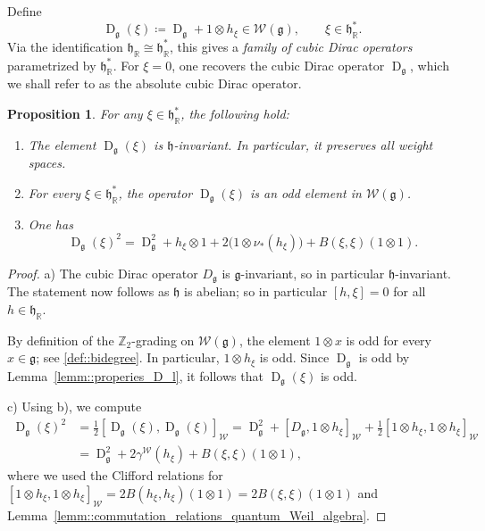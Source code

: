 \documentclass[11pt]{amsart}
\newcommand{\Dirac}{\operatorname{D}}
\def\WW{{\mathcal{W}}}
\def\Weil{{\mathcal{W}(\gg)}}
\def\RR{{\mathbb R}}
\def\hh{{\mathfrak h}}
\def\gg{{\mathfrak{g}}}
\def\ZZ{{\mathbb Z}}
\theoremstyle{plain}
\newtheorem{proposition}[theorem]{Proposition}
\theoremstyle{remark}
\theoremstyle{definition}
\numberwithin{equation}{section}
\theoremstyle{remark}
\begin{document}
Define
\begin{equation}
\Dirac_{\gg}(\xi)\coloneqq \Dirac_{\gg}+1\otimes h_{\xi}\in\mathcal{W}(\gg),
\qquad \xi\in\hh_{\RR}^{\ast}.
\end{equation}
Via the identification $\hh_{\RR}\cong\hh_{\RR}^{\ast}$, this gives a \emph{family of cubic Dirac operators} parametrized by $\hh_{\RR}^{\ast}$. For $\xi=0$, one recovers the cubic Dirac operator $\Dirac_{\gg}$, which we shall refer to as the absolute cubic Dirac operator.

\begin{proposition}\label{prop::square_family_even}
For any $\xi\in\hh_{\RR}^{\ast}$, the following hold:
\begin{enumerate}
\item[a)] The element $\Dirac_{\gg}(\xi)$ is $\hh$-invariant. In particular, it preserves all weight spaces.
\item[b)] For every $\xi\in\hh_{\RR}^{\ast}$, the operator $\Dirac_{\gg}(\xi)$ is an odd element in $\Weil$.
\item[c)] One has
\[
\Dirac_{\gg}(\xi)^{2}
=\Dirac_{\gg}^{2}+h_{\xi}\otimes1+2\bigl(1\otimes\nu_{\ast}(h_{\xi})\bigr)
+B(\xi,\xi)(1\otimes1).
\]
\end{enumerate}
\end{proposition}

\begin{proof}
 a) The cubic Dirac operator $D_{\gg}$ is $\gg$-invariant, so in particular $\hh$-invariant. The statement now follows as $\hh$ is abelian; so in particular $[h,\xi]=0$ for all $h \in \hh_{\RR}$. 

\item[b)] By definition of the $\ZZ_{2}$-grading on $\Weil$, the element $1\otimes x$ is odd for every $x\in\gg$; see \eqref{def::bidegree}. In particular, $1\otimes h_{\xi}$ is odd. Since $\Dirac_{\gg}$ is odd by Lemma~\ref{lemm::properies_D_l}, it follows that $\Dirac_{\gg}(\xi)$ is odd.
 
 c) Using b), we compute
 \[
 \begin{aligned}
 \Dirac_{\gg}(\xi)^{2} &=\tfrac{1}{2}[\Dirac_{\gg}(\xi), \Dirac_{\gg}(\xi)]_{\WW}=\Dirac_{\gg}^{2} + [D_{\gg},1\otimes h_\xi]_{\WW} + \tfrac{1}{2}[1\otimes h_\xi, 1 \otimes h_{\xi}]_{\WW} \\ &=\Dirac_{\gg}^{2}+2\gamma^{\mathcal{W}}(h_{\xi})+B(\xi,\xi)(1\otimes 1),
 \end{aligned}
 \]
 where we used the Clifford relations for $[1\otimes h_\xi,1\otimes h_\xi]_{\WW}=2B(h_{\xi},h_{\xi})(1\otimes 1)=2B(\xi,\xi)(1\otimes 1)$ and Lemma~\ref{lemm::commutation_relations_quantum_Weil_algebra}. 
\end{proof}
\end{document}
